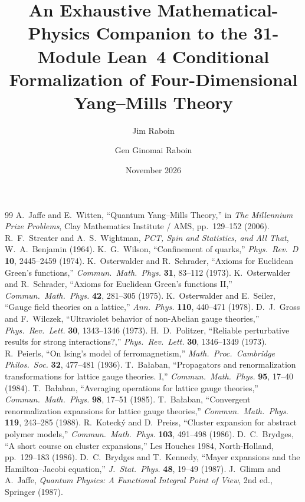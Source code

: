 \documentclass[11pt,a4paper]{article}
\title{\textbf{An Exhaustive Mathematical-Physics Companion to the 31-Module Lean~4 Conditional Formalization of Four-Dimensional Yang--Mills Theory}}
\author{Jim Raboin \and Gen Ginomai Raboin}
\date{November 2026}
\begin{document}
\maketitle
\tableofcontents
\newpage








\begin{thebibliography}{99}
 A.~Jaffe and E.~Witten, ``Quantum Yang--Mills Theory,'' in \emph{The Millennium Prize Problems}, Clay Mathematics Institute / AMS, pp.~129--152 (2006).
 R.~F.~Streater and A.~S.~Wightman, \emph{PCT, Spin and Statistics, and All That}, W.~A.~Benjamin (1964).
 K.~G.~Wilson, ``Confinement of quarks,'' \emph{Phys.\ Rev.\ D} \textbf{10}, 2445--2459 (1974).
 K.~Osterwalder and R.~Schrader, ``Axioms for Euclidean Green's functions,'' \emph{Commun.\ Math.\ Phys.} \textbf{31}, 83--112 (1973).
 K.~Osterwalder and R.~Schrader, ``Axioms for Euclidean Green's functions II,'' \emph{Commun.\ Math.\ Phys.} \textbf{42}, 281--305 (1975).
 K.~Osterwalder and E.~Seiler, ``Gauge field theories on a lattice,'' \emph{Ann.\ Phys.} \textbf{110}, 440--471 (1978).
 D.~J.~Gross and F.~Wilczek, ``Ultraviolet behavior of non-Abelian gauge theories,'' \emph{Phys.\ Rev.\ Lett.} \textbf{30}, 1343--1346 (1973).
 H.~D.~Politzer, ``Reliable perturbative results for strong interactions?,'' \emph{Phys.\ Rev.\ Lett.} \textbf{30}, 1346--1349 (1973).
 R.~Peierls, ``On Ising's model of ferromagnetism,'' \emph{Math.\ Proc.\ Cambridge Philos.\ Soc.} \textbf{32}, 477--481 (1936).
 T.~Ba{\l}aban, ``Propagators and renormalization transformations for lattice gauge theories. I,'' \emph{Commun.\ Math.\ Phys.} \textbf{95}, 17--40 (1984).
 T.~Ba{\l}aban, ``Averaging operations for lattice gauge theories,'' \emph{Commun.\ Math.\ Phys.} \textbf{98}, 17--51 (1985).
 T.~Ba{\l}aban, ``Convergent renormalization expansions for lattice gauge theories,'' \emph{Commun.\ Math.\ Phys.} \textbf{119}, 243--285 (1988).
 R.~Koteck\'y and D.~Preiss, ``Cluster expansion for abstract polymer models,'' \emph{Commun.\ Math.\ Phys.} \textbf{103}, 491--498 (1986).
 D.~C.~Brydges, ``A short course on cluster expansions,'' Les Houches 1984, North-Holland, pp.~129--183 (1986).
 D.~C.~Brydges and T.~Kennedy, ``Mayer expansions and the Hamilton--Jacobi equation,'' \emph{J.\ Stat.\ Phys.} \textbf{48}, 19--49 (1987).
 J.~Glimm and A.~Jaffe, \emph{Quantum Physics: A Functional Integral Point of View}, 2nd ed., Springer (1987).
\end{thebibliography}
\end{document}
